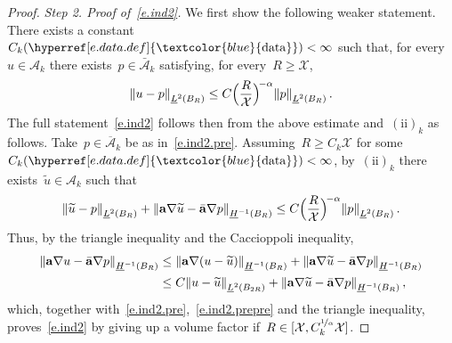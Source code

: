 \documentclass[11pt,twoside]{article} %
\numberwithin{equation}{section}
\theoremstyle{definition}
\newcommand{\dataref}{\hyperref[e.data.def]{\textcolor{blue}{\ensuremath{\mathrm{data}}}}}
\let\originalleft\left
\let\originalright\right
\renewcommand{\left}{\mathopen{}\mathclose\bgroup\originalleft}
\renewcommand{\right}{\aftergroup\egroup\originalright}
\renewcommand*{\tilde}{\widetilde}
\renewcommand{\a}{\mathbf{a}}
\newcommand{\ahom}{\bar{\a}}
\newcommand{\X}{\mathcal{X}}
\newcommand{\A}{\mathcal{A}}
\newcommand{\Ahom}{\bar{\A}}
\begin{document}
\begin{proof}
\emph{Step 2. Proof of~\eqref{e.ind2}.} We first show the following weaker statement. There exists a constant~$C_k(\dataref)<\infty$ such that, for every~$u\in \A_k$ there exists~$p \in \Ahom_k$ satisfying, for every~$R\geq \X$,
\begin{equation}  \label{e.ind2.pre}
\left\| u - p \right\|_{\underline{L}^2(B_R)} 
\leq 
C \Bigl( \frac{R}{\X} \Bigr)^{\!-\alpha}
\left\| p \right\|_{\underline{L}^2(B_R)} \,.
\end{equation}
The full statement~\eqref{e.ind2} follows then from the above estimate and~$\mathrm{(ii)}_k$ as follows. 
Take~$p \in \overline{\A}_k$ be as in~\eqref{e.ind2.pre}. Assuming~$R \geq C_k \X$ for some~$C_k(\dataref)<\infty$, by~$\mathrm{(ii)}_k$ there exists~$\tilde u \in  \A_k$ such that
\begin{equation}  \label{e.ind2.prepre}
\left\| \tilde u - p \right\|_{\underline{L}^2(B_R)} 
+
\left\|  \a \nabla \tilde u - \ahom \nabla p \right\|_{\underline{H}^{-1}(B_R)} 
\leq
C \Bigl( \frac{R}{\X} \Bigr)^{\!-\alpha}
\left\| p \right\|_{\underline{L}^2(B_R)} 
\,.
\end{equation}
Thus, by the triangle inequality and the Caccioppoli inequality,
\begin{align*}  
\left\|  \a \nabla u - \ahom \nabla p \right\|_{\underline{H}^{-1}(B_R)} 
& 
\leq
\left\|  \a \nabla ( u - \tilde u )\right\|_{\underline{H}^{-1}(B_R)} 
+ 
\left\|  \a \nabla \tilde u - \ahom \nabla p \right\|_{\underline{H}^{-1}(B_R)} 
\\ & 
\leq 
C 
\left\| u - \tilde u \right\|_{\underline{L}^2(B_{2R})}  
+ 
\left\|  \a \nabla \tilde u - \ahom \nabla p \right\|_{\underline{H}^{-1}(B_R)}
 \,,
\end{align*}
which, together with~\eqref{e.ind2.pre},~\eqref{e.ind2.prepre} and the triangle inequality, proves~\eqref{e.ind2} by giving up a volume factor if~$R \in [\X,C_k^{\nicefrac1\alpha}\X]$. 

\smallskip


\end{proof}
\end{document}
